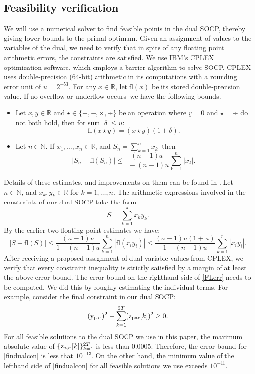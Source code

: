 \documentclass[12pt]{article}
\newcommand{\fl}{\text{fl}}
\numberwithin{equation}{section}
\begin{document}
\subsection{Feasibility verification} 

We will use a numerical solver to find feasible points in the dual SOCP, thereby giving lower bounds to the primal optimum. Given an assignment of values to the variables of the dual, we need to verify that in spite of any floating point arithmetic errors, the constraints are satisfied. We use IBM's CPLEX optimization software, which employs a barrier algorithm to solve SOCP. CPLEX uses double-precision (64-bit) arithmetic in its computations with a rounding error unit of $u = 2^{-53}$. For any $x \in \mathbb{R}$, let $\fl(x)$ be its stored double-precision value. If no overflow or underflow occurs, we have the following bounds. 

\begin{itemize}
\item Let $x,y \in \mathbb{R}$ and $\star \in \{ +,-,\times,\div\}$ be an operation where $y = 0$ and $\star = \div$ do not both hold, then for sum $|\delta| \leq u$:
\[\fl(x \star y) = (x \star y)(1+\delta) .\]
\item Let $n \in \mathbb{N}$. If $x_1,\ldots,x_n \in \mathbb{R}$, and $S_n = \sum_{k=1}^n x_k$, then
\[ \big| S_n - \fl (S_n) \big| \leq \frac{(n-1)u}{1-(n-1)u} \sum_{k=1}^n |x_k|.\]
\end{itemize}

Details of these estimates, and improvements on them can be found in  \cite{HIG}. Let $n \in \mathbb{N}$, and $x_k,y_k \in \mathbb{R}$ for $k=1,\ldots,n$. The arithmetic expressions involved in the constraints of our dual SOCP take the form 
\[ S= \sum_{k=1}^n x_ky_k .\]
By the earlier two floating point estimates we have: 
\begin{equation}\label{FLerr} \big| S - \fl (S) \big| \leq \frac{(n-1)u}{1-(n-1)u} \sum_{k=1}^n |\fl(x_iy_i)| \leq \frac{(n-1)u(1+u)}{1-(n-1)u} \sum_{k=1}^n |x_iy_i| .\end{equation}
After receiving a proposed assignment of dual variable values from CPLEX, we verify that every constraint inequality is strictly satisfied by a margin of at least the above error bound. The error bound on the righthand side of \eqref{FLerr} needs to be computed. We did this by roughly estimating the individual terms. For example, consider the final constraint in our dual SOCP: 
\begin{equation}\label{findualcon}   (\text{y\textsubscript{par}})^2 - \sum_{k=1}^{2T} ( \text{z\textsubscript{par}}[k] )^2  \geq 0. \end{equation}
For all feasible solutions to the dual SOCP we use in this paper, the maximum absolute value of $\{\text{z\textsubscript{par}}[k]\}_{k=1}^{2T}$ is less than 0.0005. Therefore, the error bound for \eqref{findualcon} is less that $10^{-13}$. On the other hand, the minimum value of the lefthand side of \eqref{findualcon} for all feasible solutions we use exceeds $10^{-11}$. 
\end{document}
